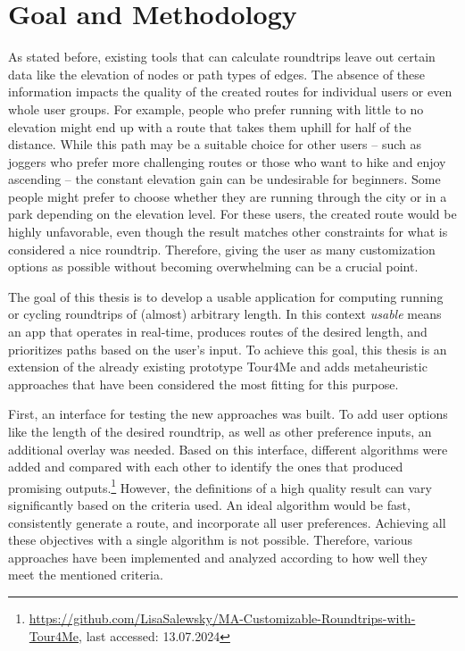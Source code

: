 \section{Goal and Methodology}
\label{sec:goal}

As stated before, existing tools that can calculate roundtrips leave out certain data like the elevation of nodes or path types of edges.
The absence of these information impacts the quality of the created routes for individual users or even whole user groups. 
For example, people who prefer running with little to no elevation might end up with a route that takes them uphill for half of the distance.
While this path may be a suitable choice for other users -- such as joggers who prefer more challenging routes or those who want to hike and enjoy ascending -- the constant elevation gain can be undesirable for beginners.
Some people might prefer to choose whether they are running through the city or in a park depending on the elevation level.
For these users, the created route would be highly unfavorable, even though the result matches other constraints for what is considered a nice roundtrip.
Therefore, giving the user as many customization options as possible without becoming overwhelming can be a crucial point. 


The goal of this thesis is to develop a usable application for computing running or cycling roundtrips of (almost) arbitrary length. 
In this context \textit{usable} means an app that operates in real-time, produces routes of the desired length, and prioritizes paths based on the user's input. 
To achieve this goal, this thesis is an extension of the already existing prototype Tour4Me \cite{buchin_tour4me_2022} and adds metaheuristic approaches that have been considered the most fitting for this purpose. 

First, an interface for testing the new approaches was built. 
To add user options like the length of the desired roundtrip, as well as other preference inputs, an additional overlay was needed.
Based on this interface, different algorithms were added and compared with each other to identify the ones that produced promising outputs.\footnote{\url{https://github.com/LisaSalewsky/MA-Customizable-Roundtrips-with-Tour4Me}, last accessed: 13.07.2024} 
However, the definitions of a high quality result can vary significantly based on the criteria used. 
An ideal algorithm would be fast, consistently generate a route, and incorporate all user preferences.
Achieving all these objectives with a single algorithm is not possible. 
Therefore, various approaches have been implemented and analyzed according to how well they meet the mentioned criteria. 


